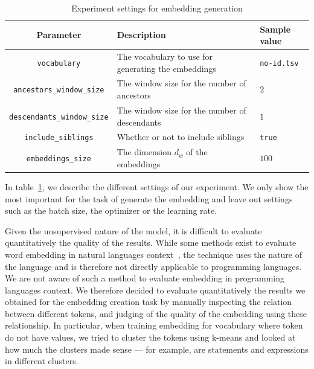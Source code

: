 \begin{table}
  \caption{\label{tab:embedding-hyper-parameters} Experiment settings for
    embedding generation}
  \begin{center}
    \begin{tabularx}{\linewidth}{c X l}
      \toprule
      Parameter & Description & Sample value\\
      \toprule
      \lstinline{vocabulary} & The vocabulary to use for generating the
      embeddings & \lstinline{no-id.tsv}\\
      \lstinline{ancestors_window_size} & The window size for the number of
      ancestors & $2$\\
      \lstinline{descendants_window_size} & The window size for the number of
      descendants & $1$\\
      \lstinline{include_siblings} & Whether or not to include siblings &
      \lstinline{true}\\
      \lstinline{embeddings_size} & The dimension $d_w$ of the embeddings & $100$\\
      \bottomrule
    \end{tabularx}
  \end{center}
\end{table}

In table~\ref{tab:embedding-hyper-parameters}, we describe the different
settings of our experiment. We only show the most important
for the task of generate the embedding and leave out settings such as the batch
size, the optimizer or the learning rate.

Given the unsupervised nature of the model, it is difficult to evaluate
quantitatively the quality of the results. While some methods exist to evaluate
word embedding in natural languages context~\cite{schnabel2015eval}, the
technique uses the nature of the language and is therefore not directly
applicable to programming languages. We are not aware of such a method to
evaluate embedding in programming languages context. We therefore decided to
evaluate quantitatively the results we obtained for the embedding creation task
by manually inspecting the relation between different tokens, and judging of the
quality of the embedding using these relationship. In particular, when training
embedding for vocabulary where token do not have values, we tried to cluster the
tokens using k-means\cite{Kanungo:2002:EKC:628329.628801} and looked at how much
the clusters made sense --- for example, are statements and expressions in
different clusters.

